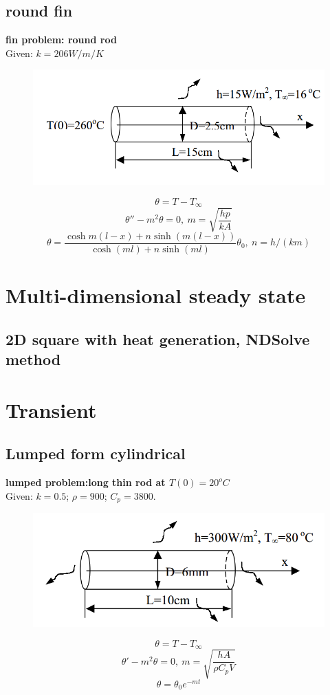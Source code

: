 \begin{appendices}
\subsection{round fin}
\begin{example}
\textbf{fin problem: round rod}\\
Given: $k=206W/m/K$
\begin{figure}[H]
  \centering
    \includegraphics[scale=0.5]{figures/appendixA/3}
\end{figure}
$$\theta=T-T_\infty$$
$$\theta''-m^2\theta=0,~m=\sqrt{\frac{hp}{kA}}$$
$$\theta=\frac{\cosh{m(l-x)}+n\sinh{(m(l-x))}}{\cosh{(ml)}+n\sinh{(ml)}}\theta_0,~n=h/(km)$$
\end{example}

\section{Multi-dimensional steady state}
\subsection{2D square with heat generation, NDSolve method}

\section{Transient}
\subsection{Lumped form cylindrical}
\begin{example}
\textbf{lumped problem:long thin rod at $T(0)=20^oC$}\\
Given: $k = 0.5$; $\rho= 900$; $C_p = 3800$.
\begin{figure}[H]
  \centering
    \includegraphics[scale=0.5]{figures/appendixA/4}
\end{figure}
$$\theta=T-T_\infty$$
$$\theta'-m^2\theta=0,~m=\sqrt{\frac{hA}{\rho C_pV}}$$
$$\theta=\theta_0e^{-mt}$$
\end{example}

\end{appendices}

